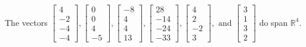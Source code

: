 \begin{exercise}
\begin{exerciseStatement}
  \end{exerciseStatement}
  \begin{exerciseAnswer}
   The vectors \(\left[\begin{array}{r}
4 \\
-2 \\
-4 \\
-4
\end{array}\right] , \left[\begin{array}{r}
0 \\
0 \\
4 \\
-5
\end{array}\right] , \left[\begin{array}{r}
-8 \\
4 \\
4 \\
13
\end{array}\right] , \left[\begin{array}{r}
28 \\
-14 \\
-24 \\
-33
\end{array}\right] , \left[\begin{array}{r}
4 \\
2 \\
-2 \\
3
\end{array}\right] , \text{ and } \left[\begin{array}{r}
3 \\
1 \\
3 \\
2
\end{array}\right]\) 
  	 do  
	span \(\mathbb{R}^4\).
  


  \end{exerciseAnswer}
\end{exercise}